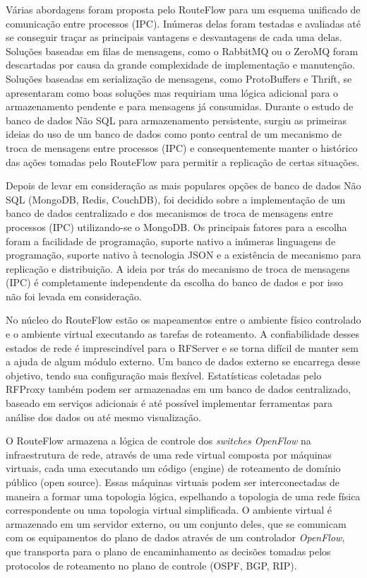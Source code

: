 Várias abordagens foram proposta pelo RouteFlow para um
esquema unificado de comunicação entre processos (IPC). 
Inúmeras delas foram testadas e avaliadas até se conseguir 
traçar as principais vantagens e desvantagens de cada uma delas.
Soluções baseadas em filas de mensagens, como o RabbitMQ
ou o ZeroMQ foram descartadas por causa da grande complexidade
de implementação e manutenção. Soluções baseadas em serialização
de mensagens, como ProtoBuffers e Thrift, se apresentaram como
boas soluções mas requiriam uma lógica adicional para o armazenamento
pendente e para mensagens já consumidas. Durante o estudo
de banco de dados Não SQL para armazenamento persistente,
surgiu as primeiras ideias do uso de um banco de dados como
ponto central de um mecanismo de troca de mensagens entre 
processos (IPC) e consequentemente manter o histórico das 
ações tomadas pelo RouteFlow para permitir a replicação de certas
situações.

Depois de levar em consideração as mais populares opções de 
banco de dados Não SQL (MongoDB, Redis, CouchDB), foi 
decidido sobre a implementação de um banco de dados centralizado
e dos mecanismos de troca de mensagens entre processos (IPC) 
utilizando-se o MongoDB. Os principais fatores para a escolha foram
a facilidade de programação, suporte nativo a inúmeras linguagens de 
programação, suporte nativo à tecnologia JSON e a existência de 
mecanismo para replicação e distribuição. A ideia por trás do
mecanismo de troca de mensagens (IPC) é completamente
independente da escolha do banco de dados e por isso não 
foi levada em consideração.

No núcleo do RouteFlow estão os mapeamentos entre o ambiente
físico controlado e o ambiente virtual executando as tarefas de
roteamento. A confiabilidade desses estados de rede é imprescindível 
para o RFServer e se torna difícil de manter sem a ajuda de 
algum módulo externo. Um banco de dados externo se encarrega
desse objetivo, tendo sua configuração mais flexível. Estatísticas
coletadas pelo RFProxy também podem ser armazenadas em 
um banco de dados centralizado, baseado em serviços adicionais
é até possível implementar ferramentas para análise dos dados 
ou até mesmo visualização.







O RouteFlow armazena a lógica de
controle dos \textit{switches OpenFlow} na infraestrutura de rede,
através de uma rede virtual composta por máquinas virtuais, cada uma executando um código
(engine) de roteamento de domínio público (open source).
Essas máquinas virtuais podem ser interconectadas
de maneira a formar uma topologia lógica, espelhando a
topologia de uma rede física correspondente ou uma topologia
virtual simplificada. O ambiente virtual é armazenado em um
servidor externo, ou um conjunto deles, que se comunicam com
os equipamentos do plano de dados através de um controlador
\textit{OpenFlow}, que transporta para o plano de encaminhamento as
decisões tomadas pelos protocolos de roteamento no plano de
controle (OSPF, BGP, RIP). 

